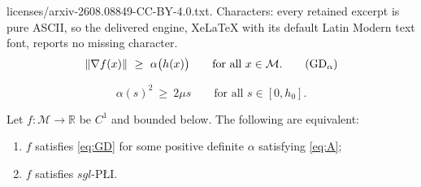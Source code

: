 \documentclass[10pt,a4paper]{amsart}
\newcommand{\M}{\mathcal{M}}
\newcommand{\R}{\mathbb{R}}
\begin{document}
licenses/arxiv-2608.08849-CC-BY-4.0.txt. Characters: every retained excerpt is pure ASCII, so the delivered engine, XeLaTeX with its default Latin Modern text font, reports no missing character.
\begin{equation}
  \|\nabla f(x)\| \ \ge\ \alpha\bigl(h(x)\bigr) \qquad \text{for all } x \in \M .
  \tag{$\mathrm{GD}_\alpha$}\label{eq:GD}
\end{equation}

\begin{equation}
  \alpha(s)^2 \ \ge\ 2\mu s \qquad \text{for all } s \in [0,h_0] .
  \tag{A}\label{eq:A}
\end{equation}

\begin{prop}\label{prop:sgl}
Let $f\colon\M\to\R$ be $C^1$ and bounded below. The following are equivalent:
\begin{enumerate}
\item[(i)] $f$ satisfies \eqref{eq:GD} for some positive definite $\alpha$
satisfying \eqref{eq:A};
\item[(ii)] $f$ satisfies $sgl$-P\L{}I.
\end{enumerate}
\end{prop}
\end{document}
